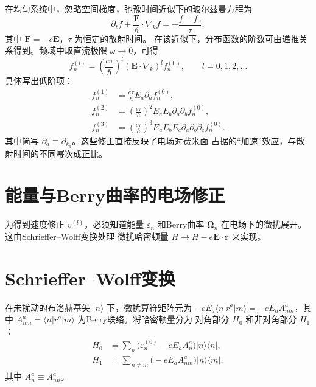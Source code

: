 在均匀系统中，忽略空间梯度，弛豫时间近似下的玻尔兹曼方程为
\begin{equation}
  \partial_t f + \frac{\mathbf{F}}{\hbar} \cdot \nabla_k f
  = -\frac{f - f_0}{\tau},
\end{equation}
其中 \(\mathbf{F} = -e\mathbf{E}\)，\(\tau\) 为恒定的散射时间。
在该近似下，分布函数的阶数可由递推关系得到。频域中取直流极限
\(\omega \to 0\)，可得
\begin{equation}
  f_n^{(l)} = \left(\frac{e\tau}{\hbar}\right)^l
  (\mathbf{E} \cdot \nabla_k)^l f_n^{(0)},
  \qquad l = 0,1,2,\dots
  \label{eq:f_recursion}
\end{equation}
具体写出低阶项：
\begin{align}
  f_n^{(1)} &= \frac{e\tau}{\hbar} E_a \partial_a f_n^{(0)}, \label{f1}\\
  f_n^{(2)} &= \left(\frac{e\tau}{\hbar}\right)^2 E_a E_b \partial_a \partial_b f_n^{(0)}, \label{f2}\\
  f_n^{(3)} &= \left(\frac{e\tau}{\hbar}\right)^3 E_a E_b E_c \partial_a \partial_b \partial_c f_n^{(0)}. \label{f3}
\end{align}
其中简写 \(\partial_a \equiv \partial_{k_a}\)。这些修正直接反映了电场对费米面
占据的“加速”效应，与散射时间的不同幂次成正比。

\section{能量与Berry曲率的电场修正}

为得到速度修正 \(v^{(l)}\)，必须知道能量 \(\varepsilon_n\) 和Berry曲率
\(\bm{\Omega}_n\) 在电场下的微扰展开。这由Schrieffer–Wolff变换处理
微扰哈密顿量 \(H \to H - e\mathbf{E}\cdot \mathbf{r}\) 来实现。

\section{Schrieffer–Wolff变换}

在未扰动的布洛赫基矢 \(|n\rangle\) 下，微扰算符矩阵元为
\(-eE_a \langle n|r^a|m\rangle = -eE_a A^a_{nm}\)，其中
\(A^a_{nm} = \langle n|r^a|m\rangle\) 为Berry联络。将哈密顿量分为
对角部分 \(H_0\) 和非对角部分 \(H_1\)：
\begin{align}
  H_0 &= \sum_n \bigl( \varepsilon_n^{(0)} - eE_a A^a_n \bigr) |n\rangle\langle n|, \label{H0}\\
  H_1 &= \sum_{n\neq m} \bigl( -eE_a A^a_{nm} \bigr) |n\rangle\langle m|, \label{H1}
\end{align}
其中 \(A^a_n \equiv A^a_{nn}\)。


